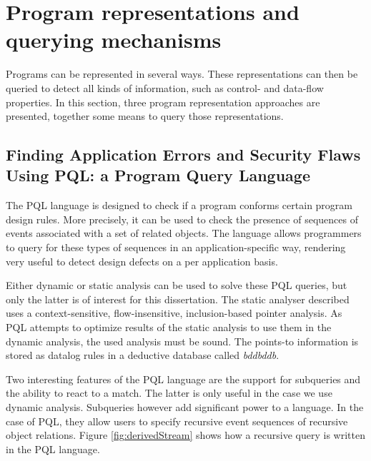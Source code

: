 \section{Program representations and querying mechanisms} %

Programs can be represented in several ways. These representations can then be queried to detect all kinds of information, such as control- and data-flow properties. In this section, three program representation approaches are presented, together some means to query those representations.

\subsection{Finding Application Errors and Security Flaws Using PQL: a Program Query Language}
The PQL language is designed to check if a program conforms certain program design rules\cite{PQL}. More precisely, it can be used to check the presence of sequences of events associated with a set of related objects. The language allows programmers to query for these types of sequences in an application-specific way, rendering very useful to detect design defects on a per application basis.

Either dynamic or static analysis can be used to solve these PQL queries, but only the latter is of interest for this dissertation. The static analyser described uses a context-sensitive, flow-insensitive, inclusion-based pointer analysis. As PQL attempts to optimize results of the static analysis to use them in the dynamic analysis, the used analysis must be sound. The points-to information is stored as datalog rules in a deductive database called \textit{bddbddb}. 

Two interesting features of the PQL language are the support for subqueries and the ability to react to a match. The latter is only useful in the case we use dynamic analysis. Subqueries however add significant power to a language. In the case of PQL, they allow users to specify recursive event sequences of recursive object relations. Figure \ref{fig:derivedStream} shows how a recursive query is written in the PQL language.

